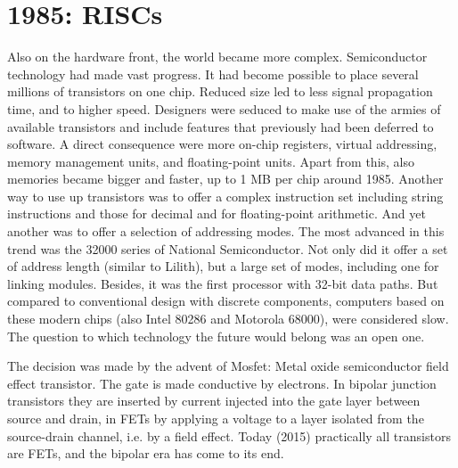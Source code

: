 \section{1985: RISCs}
Also on the hardware front, the world became more complex. Semiconductor
technology had made vast progress. It had become possible to place several
millions of transistors on one chip. Reduced size led to less signal propagation
time, and to higher speed. Designers were seduced to make use of the armies of
available transistors and include features that previously had been deferred to
software. A direct consequence were more on-chip registers, virtual addressing,
memory management units, and floating-point units. Apart from this, also
memories became bigger and faster, up to 1 MB per chip around 1985. Another
way to use up transistors was to offer a complex instruction set including string
instructions and those for decimal and for floating-point arithmetic. And yet another
was to offer a selection of addressing modes. The most advanced in this trend was
the 32000 series of National Semiconductor. Not only did it offer a set of address
length (similar to Lilith), but a large set of modes, including one for linking modules.
Besides, it was the first processor with 32-bit data paths. But compared to
conventional design with discrete components, computers based on these modern
chips (also Intel 80286 and Motorola 68000), were considered slow. The question
to which technology the future would belong was an open one.

The decision was made by the advent of Mosfet: Metal oxide semiconductor field
effect transistor. The gate is made conductive by electrons. In bipolar junction
transistors they are inserted by current injected into the gate layer between source
and drain, in FETs by applying a voltage to a layer isolated from the source-drain
channel, i.e. by a field effect. Today (2015) practically all transistors are FETs, and
the bipolar era has come to its end.

